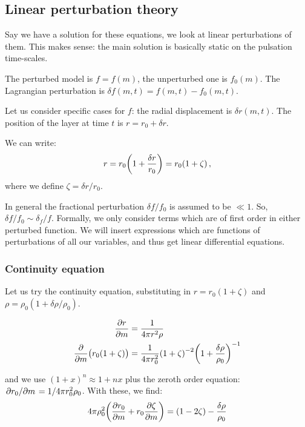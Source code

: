 \documentclass[main.tex]{subfiles}
\begin{document}
\subsection{Linear perturbation theory}

Say we have a solution for these equations, we look at linear perturbations of them.
This makes sense: the main solution is basically static on the pulsation time-scales.

The perturbed model is \(f = f(m)\),  the unperturbed one is \(f_0(m)\).
The Lagrangian perturbation is \(\delta f (m, t) = f(m, t) - f_0(m, t)\).

Let us consider specific cases for \(f\): the radial displacement is \(\delta r (m, t)\). The position of the layer at time \(t\) is \(r = r_0 + \delta r\).

We can write:
%
\begin{equation}
  r = r_0 \qty(1 + \frac{\delta r}{r_0} ) = r_0 (1+ \zeta)
  \,,
\end{equation}
%
where we define \(\zeta = \delta r / r_0 \).

In general the fractional perturbation \(\delta f / f_0\) is assumed to be \(\ll 1 \). So, \(\delta f / f_0 \sim \delta_f / f\). Formally, we only consider terms which are of first order in either perturbed function.
We will insert expressions which are functions of perturbations of all our variables, and thus get linear differential equations.

\subsubsection{Continuity equation}

Let us try the continuity equation, substituting in \(r = r_0 (1+\zeta)\) and \(\rho = \rho_0 (1 + \delta \rho / \rho_0)\).

\begin{align}
  \pdv{r}{m} &= \frac{1}{4 \pi r^2 \rho }  \\
  \pdv{}{m} \qty(r_0 (1+\zeta)) &=
  \frac{1}{4 \pi r_0^2} \qty(1+\zeta)^{-2} \qty(1 + \frac{\delta \rho}{\rho_0})^{-1}
\end{align}

and we use \((1+x)^n \approx 1 + nx\) plus the zeroth order equation: \(\pdv*{r_0 }{m} = 1 / 4 \pi r_0^2 \rho_0\). 
With these, we find:
%
\begin{equation}
  4 \pi \rho_0^2 \qty(\pdv{r_0}{m} (1+\zeta) + r_0 \pdv{\zeta}{m})
  = (1-2 \zeta) -\frac{\delta \rho}{\rho_0}
\end{equation}
\end{document}

